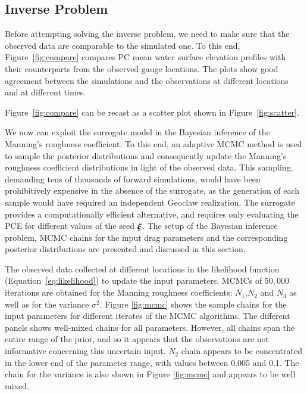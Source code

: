 \subsection{Inverse Problem} 
\label{sec:inverse}

Before attempting solving the inverse problem,
we need to make sure that the observed data are
comparable to the simulated one.
To this end, Figure~\ref{fig:compare}
compares PC mean water surface elevation profiles
with their counterparts from the observed gauge locations.
The plots show good agreement between the simulations and the observations at different
locations and at different times. 
%

   

Figure~\ref{fig:compare} can be recast as a scatter plot shown in 
Figure~\ref{fig:scatter}.

We now can exploit the surrogate model in the Bayesian inference of the Manning's 
roughness coefficient.  To this end, an adaptive MCMC method is used to sample 
the posterior distributions \citep{Gareth2009,Haario2001} and consequently 
update the Manning's roughness coefficient distributions in light of the 
observed data. This sampling, demanding tens of thousands of forward simulations, 
would have been prohibitively expensive in the
absence of the surrogate, as the generation of each sample would have required an
independent Geoclaw realization. The surrogate provides a computationally
efficient alternative, and requires only evaluating the PCE for different values 
of the seed $\xxi$. The setup of the Bayesian inference problem,
MCMC chains for the input drag parameters and the corresponding posterior distributions are 
presented and discussed in this section. 




The observed data collected at different locations 
in the likelihood function (Equation~\ref{eq:likelihood}) to update the input parameters.
MCMCs of $50,000$ iterations are obtained for the Manning roughness coefficients: 
$N_1$,$N_2$ and $N_3$ as well as for the variance $\sigma^2$. Figure \ref{fig:mcmc} 
shows the sample chains for
the input parameters for different iterates of the MCMC algorithms. 
The different panels
shows well-mixed chains for all parameters.
However, all chains span the entire range
of the prior, and so it appears that the observations are not informative 
concerning this uncertain input.  $N_{2}$ chain appears to be concentrated in the lower end of the
parameter range, with values between 0.005 and 0.1.
The chain for the variance is also shown in 
Figure \ref{fig:mcmc} and appears to be well mixed.






